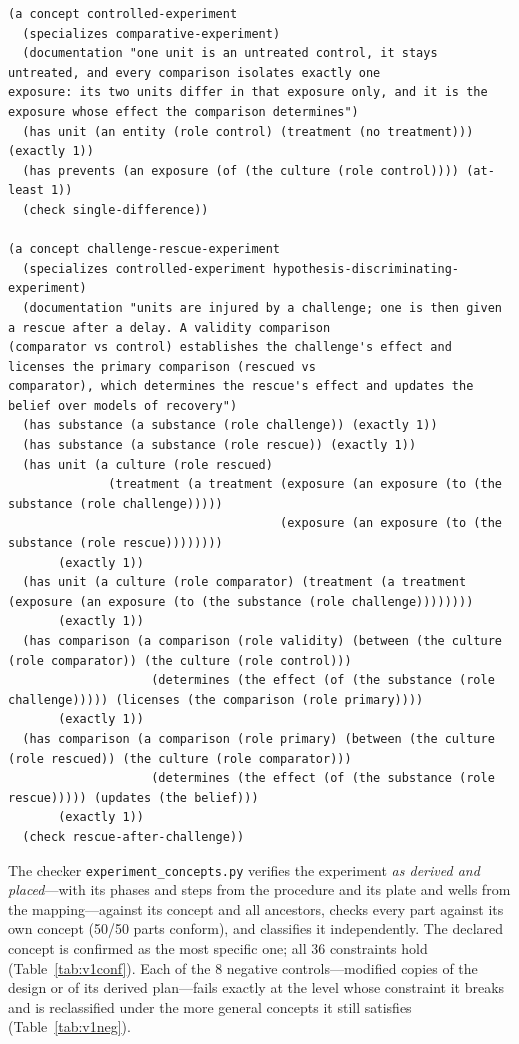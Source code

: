 \documentclass[10pt,a4paper]{article}
\begin{document}
\begin{Verbatim}[fontsize=\scriptsize,breaklines,frame=lines,framesep=2mm]
(a concept controlled-experiment
  (specializes comparative-experiment)
  (documentation "one unit is an untreated control, it stays untreated, and every comparison isolates exactly one
exposure: its two units differ in that exposure only, and it is the exposure whose effect the comparison determines")
  (has unit (an entity (role control) (treatment (no treatment))) (exactly 1))
  (has prevents (an exposure (of (the culture (role control)))) (at-least 1))
  (check single-difference))

(a concept challenge-rescue-experiment
  (specializes controlled-experiment hypothesis-discriminating-experiment)
  (documentation "units are injured by a challenge; one is then given a rescue after a delay. A validity comparison
(comparator vs control) establishes the challenge's effect and licenses the primary comparison (rescued vs
comparator), which determines the rescue's effect and updates the belief over models of recovery")
  (has substance (a substance (role challenge)) (exactly 1))
  (has substance (a substance (role rescue)) (exactly 1))
  (has unit (a culture (role rescued)
              (treatment (a treatment (exposure (an exposure (to (the substance (role challenge)))))
                                      (exposure (an exposure (to (the substance (role rescue))))))))
       (exactly 1))
  (has unit (a culture (role comparator) (treatment (a treatment (exposure (an exposure (to (the substance (role challenge))))))))
       (exactly 1))
  (has comparison (a comparison (role validity) (between (the culture (role comparator)) (the culture (role control)))
                    (determines (the effect (of (the substance (role challenge))))) (licenses (the comparison (role primary))))
       (exactly 1))
  (has comparison (a comparison (role primary) (between (the culture (role rescued)) (the culture (role comparator)))
                    (determines (the effect (of (the substance (role rescue))))) (updates (the belief)))
       (exactly 1))
  (check rescue-after-challenge))
\end{Verbatim}
\vspace{-4pt}\label{lst:concepts}\medskip


The checker \texttt{experiment\_\allowbreak{}concepts.py} verifies the experiment \emph{as derived and placed}---with its phases and
steps from the procedure and its plate and wells from the mapping---against its concept and all ancestors, checks
every part against its own concept (50/50 parts conform), and classifies it independently. The declared concept
is confirmed as the most specific one; all 36 constraints hold (Table~\ref{tab:v1conf}). Each of the
8 negative controls---modified copies of the design or of its derived plan---fails exactly at the level
whose constraint it breaks and is reclassified under the more general concepts it still satisfies
(Table~\ref{tab:v1neg}).
\end{document}
